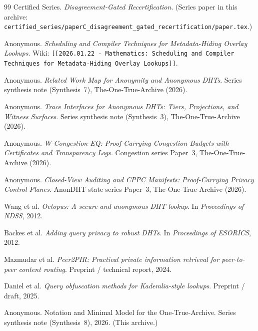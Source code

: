 \documentclass[11pt]{article}
\begin{document}
\begin{thebibliography}{99}
Certified Series.
\emph{Disagreement-Gated Recertification}.
(Series paper in this archive: \texttt{certified\_series/paperC\_disagreement\_gated\_recertification/paper.tex}.)



Anonymous.
\newblock \emph{Scheduling and Compiler Techniques for Metadata-Hiding Overlay Lookups}.
\newblock Wiki: \texttt{[[2026.01.22 - Mathematics: Scheduling and Compiler Techniques for Metadata-Hiding Overlay Lookups]]}.

Anonymous.
\newblock \emph{Related Work Map for Anonymity and Anonymous DHTs}.
\newblock Series synthesis note (Synthesis~7), The-One-True-Archive (2026).

Anonymous.
\newblock \emph{Trace Interfaces for Anonymous DHTs: Tiers, Projections, and Witness Surfaces}.
\newblock Series synthesis note (Synthesis~3), The-One-True-Archive (2026).

Anonymous.
\newblock \emph{W-Congestion-EQ: Proof-Carrying Congestion Budgets with Certificates and Transparency Logs}.
\newblock Congestion series Paper~3, The-One-True-Archive (2026).

Anonymous.
\newblock \emph{Closed-View Auditing and CPPC Manifests: Proof-Carrying Privacy Control Planes}.
\newblock AnonDHT state series Paper~3, The-One-True-Archive (2026).

Wang et al.
\newblock \emph{Octopus: A secure and anonymous DHT lookup}.
\newblock In \emph{Proceedings of NDSS}, 2012.

Backes et al.
\newblock \emph{Adding query privacy to robust DHTs}.
\newblock In \emph{Proceedings of ESORICS}, 2012.

Mazmudar et al.
\newblock \emph{Peer2PIR: Practical private information retrieval for peer-to-peer content routing}.
\newblock Preprint / technical report, 2024.

Daniel et al.
\newblock \emph{Query obfuscation methods for Kademlia-style lookups}.
\newblock Preprint / draft, 2025.



Anonymous.
\newblock Notation and Minimal Model for the One-True-Archive.
\newblock Series synthesis note (Synthesis~8), 2026. (This archive.)

\end{thebibliography}
\end{document}
